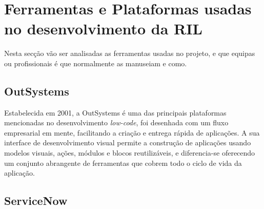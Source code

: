 \section{Ferramentas e Plataformas usadas no desenvolvimento da RIL}

    Nesta secção vão ser analisadas as ferramentas usadas no projeto, e que equipas ou profissionais é que normalmente as manuseiam e como.

    \subsection{OutSystems}\label{sec:outsystems}
    
        Estabelecida em 2001, a OutSystems é uma das principais plataformas mencionadas no desenvolvimento \textit{low-code}, foi desenhada com um fluxo empresarial em mente, facilitando a criação e entrega rápida de aplicações. A sua interface de desenvolvimento visual permite a construção de aplicações usando modelos visuais, ações, módulos e blocos reutilizáveis, e diferencia-se oferecendo um conjunto abrangente de ferramentas que cobrem todo o ciclo de vida da aplicação\cite{os-vision}.

                    

        

        

        \subsection{ServiceNow}\label{sec:service-now}

